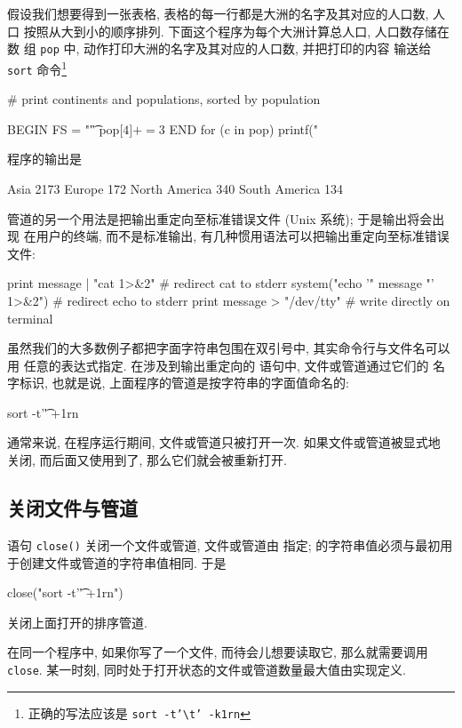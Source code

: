 假设我们想要得到一张表格, 表格的每一行都是大洲的名字及其对应的人口数, 人口
按照从大到小的顺序排列. 下面这个程序为每个大洲计算总人口, 人口数存储在数
组 \verb'pop' 中, \END 动作打印大洲的名字及其对应的人口数, 并把打印的内容
输送给 \verb'sort' 命令\footnote{正确的写法应该是 \texttt{sort
-t'}\texttt{\textbackslash}\texttt{t' -k1rn}}
\begin{awkcode}
    # print continents and populations, sorted by population

    BEGIN { FS = "\t" }
          { pop[$4] += $3 }
    END   { for (c in pop)
              printf("%
          }
\end{awkcode}
程序的输出是
\begin{awkcode}
           Asia	  2173
         Europe	   172
  North America	   340
  South America	   134
\end{awkcode}

管道的另一个用法是把输出重定向至标准错误文件 (Unix 系统); 于是输出将会出现
在用户的终端, 而不是标准输出, 有几种惯用语法可以把输出重定向至标准错误文件:
\begin{awkcode}
    print message | "cat 1>&2"          # redirect cat to stderr
    system("echo '" message "' 1>&2")   # redirect echo to stderr
    print message > "/dev/tty"          # write directly on terminal
\end{awkcode}

虽然我们的大多数例子都把字面字符串包围在双引号中, 其实命令行与文件名可以用
任意的表达式指定. 在涉及到输出重定向的 \print 语句中, 文件或管道通过它们的
名字标识, 也就是说, 上面程序的管道是按字符串的字面值命名的:
\begin{awkcode}
    sort -t'\t' +1rn
\end{awkcode}
通常来说, 在程序运行期间, 文件或管道只被打开一次. 如果文件或管道被显式地
关闭, 而后面又使用到了, 那么它们就会被重新打开.

\subsection{关闭文件与管道}
\label{subsec:closing_files_and_pipes}

语句 \verb'close('\expr\verb')' 关闭一个文件或管道, 文件或管道由 
\expr 指定; \expr 的字符串值必须与最初用于创建文件或管道的字符串值相同.
于是 
\begin{awkcode}
    close("sort -t'\t' +1rn")
\end{awkcode}
关闭上面打开的排序管道.

在同一个程序中, 如果你写了一个文件, 而待会儿想要读取它, 那么就需要调用
\verb'close'. 某一时刻, 同时处于打开状态的文件或管道数量最大值由实现定义.

